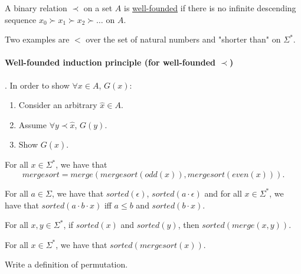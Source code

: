 \begin{definition} A binary relation $\prec$ on a set $A$ is  \underline{well-founded} if there is no infinite descending sequence $x_0 \succ x_1 \succ x_2 \succ \ldots$ on $A$.
\end{definition}

\begin{example} Two examples are $<$ over the set of natural numbers and "shorter than" on $\Sigma^*$.
\end{example}

\paragraph*{Well-founded induction principle (for well-founded $\prec$)}. In order to show $\forall x\in A$, $G(x)$:
\begin{enumerate}
    \item Consider an arbitrary $\hat{x} \in A$.
    \item Assume $\forall y \prec \hat{x}$, $G(y)$.
    \item Show $G(\hat{x})$.
\end{enumerate}


\begin{definition}[Mergesort] For all $x \in \Sigma^*$, we have that 
    \begin{equation}
        mergesort = merge(mergesort(odd(x)), mergesort(even(x))).
    \end{equation}
\end{definition}

\begin{definition}[Sorted] For all $a \in \Sigma$, we have that $sorted(\epsilon)$, $sorted(a\cdot\epsilon)$ and for all $x\in \Sigma^*$, we have that $sorted(a\cdot b\cdot x)$ iff $a\leq b$ and $sorted(b\cdot x)$.
\end{definition}

\begin{lemma}[Homework]For all $x,y \in \Sigma^*$, if $sorted(x)$ and $sorted(y)$, then $sorted(merge(x,y))$.
\end{lemma}


\begin{theorem}[Homework]For all $x\in \Sigma^*$, we have that $sorted(mergesort(x))$.
\end{theorem}

\begin{definition}[Homework] Write a definition of permutation.
\end{definition}


